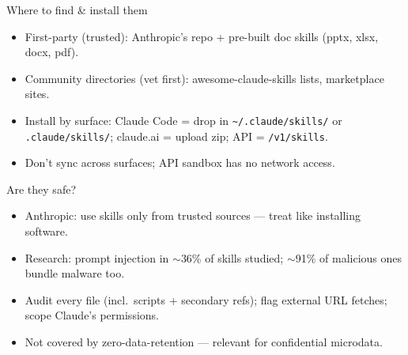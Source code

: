 \documentclass[10pt]{beamer}
\begin{document}
\begin{frame}{Where to find \& install them}
  \begin{itemize}
    \item First-party (trusted): Anthropic's repo + pre-built doc skills
          (pptx, xlsx, docx, pdf).
    \item Community directories (vet first): awesome-claude-skills lists,
          marketplace sites.
    \item Install by surface: Claude Code = drop in
          \texttt{\textasciitilde/.claude/skills/} or \texttt{.claude/skills/};
          claude.ai = upload zip; API = \texttt{/v1/skills}.
    \item Don't sync across surfaces; API sandbox has no network access.
  \end{itemize}
  \vfill
  \href{https://github.com/anthropics/skills}{}\quad
  \href{https://github.com/ComposioHQ/awesome-claude-skills}{}
\end{frame}

\begin{frame}{Are they safe?}
  \begin{itemize}
    \item Anthropic: use skills only from trusted sources --- treat like installing software.
    \item Research: prompt injection in $\sim$36\% of skills studied;
          $\sim$91\% of malicious ones bundle malware too.
    \item Audit every file (incl.\ scripts + secondary refs); flag external URL
          fetches; scope Claude's permissions.
    \item Not covered by zero-data-retention --- relevant for confidential microdata.
  \end{itemize}
  \vfill
  \href{https://snyk.io/blog/toxicskills-malicious-ai-agent-skills-clawhub/}{}\quad
  \href{https://securitylabs.datadoghq.com/articles/malicious-skills-supply-chain-risks-in-coding-agents-with-dynamic-context/}{}
\end{frame}
\end{document}
